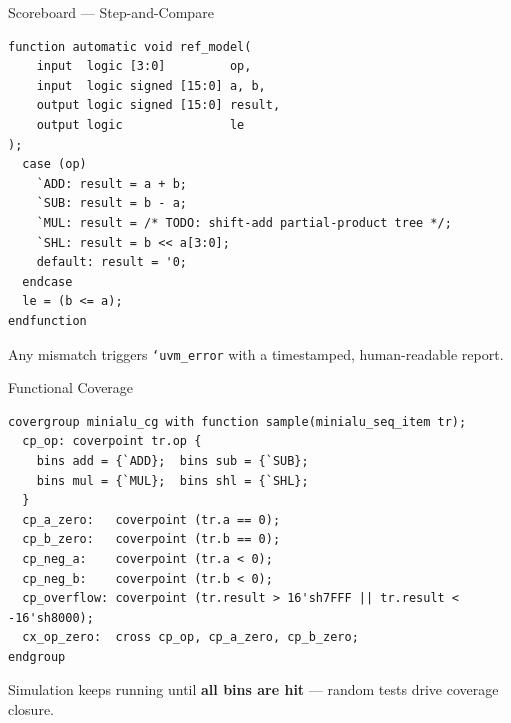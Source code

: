 \documentclass[aspectratio=169]{beamer}
\begin{document}
\begin{frame}[fragile]{Scoreboard --- Step-and-Compare}
\begin{verbatim}
function automatic void ref_model(
    input  logic [3:0]         op,
    input  logic signed [15:0] a, b,
    output logic signed [15:0] result,
    output logic               le
);
  case (op)
    `ADD: result = a + b;
    `SUB: result = b - a;
    `MUL: result = /* TODO: shift-add partial-product tree */;
    `SHL: result = b << a[3:0];
    default: result = '0;
  endcase
  le = (b <= a);
endfunction
\end{verbatim}
  \vspace{0.3em}
  \small Any mismatch triggers \texttt{`uvm\_error} with a timestamped, human-readable report.
\end{frame}

\begin{frame}[fragile]{Functional Coverage}
\begin{verbatim}
covergroup minialu_cg with function sample(minialu_seq_item tr);
  cp_op: coverpoint tr.op {
    bins add = {`ADD};  bins sub = {`SUB};
    bins mul = {`MUL};  bins shl = {`SHL};
  }
  cp_a_zero:   coverpoint (tr.a == 0);
  cp_b_zero:   coverpoint (tr.b == 0);
  cp_neg_a:    coverpoint (tr.a < 0);
  cp_neg_b:    coverpoint (tr.b < 0);
  cp_overflow: coverpoint (tr.result > 16'sh7FFF || tr.result < -16'sh8000);
  cx_op_zero:  cross cp_op, cp_a_zero, cp_b_zero;
endgroup
\end{verbatim}
  \vspace{0.2em}
  \small Simulation keeps running until \textbf{all bins are hit} --- random tests drive coverage closure.
\end{frame}
\end{document}
